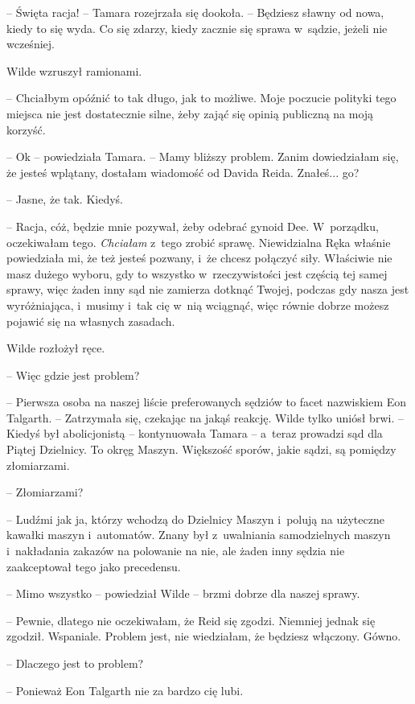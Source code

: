 \documentclass[oneside,polish,11pt,sfheadings]{mwbk}
\begin{document}
-- Święta racja! -- Tamara rozejrzała się dookoła. -- Będziesz sławny od
nowa, kiedy to się wyda. Co się zdarzy, kiedy zacznie się sprawa w~sądzie, jeżeli nie wcześniej.

Wilde wzruszył ramionami. 

-- Chciałbym opóźnić to tak długo, jak to
możliwe. Moje poczucie polityki tego miejsca nie jest dostatecznie
silne, żeby zająć się opinią publiczną na moją korzyść.

-- Ok -- powiedziała Tamara. -- Mamy bliższy problem. Zanim dowiedziałam
się, że jesteś wplątany, dostałam wiadomość od Davida Reida. Znałeś...
go?

-- Jasne, że tak. Kiedyś.

-- Racja, cóż, będzie mnie pozywał, żeby odebrać gynoid Dee. W~porządku,
oczekiwałam tego. \emph{Chciałam} z~tego zrobić sprawę. Niewidzialna
Ręka właśnie powiedziała mi, że też jesteś pozwany, i~że chcesz połączyć
siły. Właściwie nie masz dużego wyboru, gdy to wszystko w~rzeczywistości
jest częścią tej samej sprawy, więc żaden inny sąd nie zamierza dotknąć
Twojej, podczas gdy nasza jest wyróżniająca, i~musimy i~tak cię w~nią
wciągnąć, więc równie dobrze możesz pojawić się na własnych zasadach.

Wilde rozłożył ręce. 

-- Więc gdzie jest problem?

-- Pierwsza osoba na naszej liście preferowanych sędziów to facet
nazwiskiem Eon Talgarth. -- Zatrzymała się, czekając na jakąś reakcję.
Wilde tylko uniósł brwi. -- Kiedyś był abolicjonistą -- kontynuowała
Tamara -- a~teraz prowadzi sąd dla Piątej Dzielnicy. To okręg Maszyn.
Większość sporów, jakie sądzi, są pomiędzy złomiarzami.

-- Złomiarzami?

-- Ludźmi jak ja, którzy wchodzą do Dzielnicy Maszyn i~polują na
użyteczne kawałki maszyn i~automatów. Znany był z~uwalniania
samodzielnych maszyn i~nakładania zakazów na polowanie na nie, ale żaden
inny sędzia nie zaakceptował tego jako precedensu.

-- Mimo wszystko -- powiedział Wilde -- brzmi dobrze dla naszej sprawy.

-- Pewnie, dlatego nie oczekiwałam, że Reid się zgodzi. Niemniej jednak
się zgodził. Wspaniale. Problem jest, nie wiedziałam, że będziesz
włączony. Gówno.

-- Dlaczego jest to problem?

-- Ponieważ Eon Talgarth nie za bardzo cię lubi.
\end{document}
